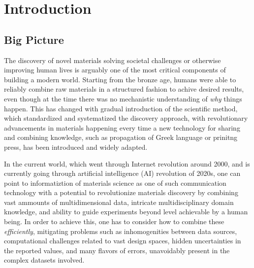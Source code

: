 \chapter{Introduction} \label{sec:Introduction}

\section{Big Picture} \label{intro:sec:bigpicture}

The discovery of novel materials solving societal challenges or otherwise improving human lives is arguably one of the most critical components of building a modern world. Starting from the bronze age, humans were able to reliably combine raw materials in a structured fashion to achive desired results, even though at the time there was no mechanistic understanding of \emph{why} things happen. This has changed with gradual introduction of the scientific method, which standardized and systematized the discovery approach, with revolutionary advancements in materials happening every time a new technology for sharing and combining knowledge, such as propagation of Greek language or prinitng press, has been introduced and widely adapted.

In the current world, which went through Internet revolution around 2000, and is currently going through artificial intelligence (AI) revolution of 2020s, one can point to informatiztion of materials science as one of such communication technology with a potential to revolutionize materials discovery by combining vast ammounts of multidimensional data, intricate  multidisciplinary domain knowledge, and ability to guide experiments beyond level achievable by a human being. In order to achieve this, one has to consider how to combine these \emph{efficiently}, mitigating problems such as inhomogenities between data sources, computational challenges related to vast design spaces, hidden uncertainties in the reported values, and many flavors of errors, unavoidably present in the complex datasets involved.

